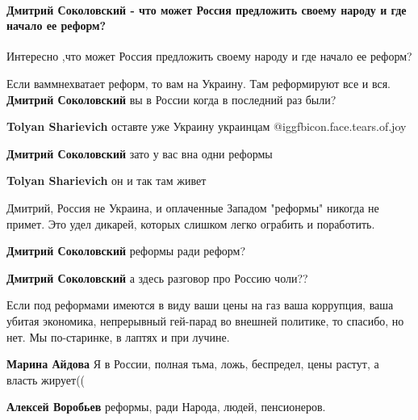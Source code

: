  
 
 
 
 
\paragraph{Дмитрий Соколовский - что может Россия предложить своему народу и где начало ее реформ?}

\begin{itemize} %
Интересно ,что может Россия предложить своему народу и где начало ее реформ?

\begin{itemize} %
Если ваммнехватает реформ, то вам на Украину. Там реформируют все и вся.
\textbf{Дмитрий Соколовский} вы в России когда в последний раз были?

\textbf{Tolyan Sharievich} оставте уже Украину украинцам @igg{fbicon.face.tears.of.joy} 

\textbf{Дмитрий Соколовский} зато у вас вна одни реформы

\textbf{Tolyan Sharievich} он и так там живет

Дмитрий, Россия не Украина, и оплаченные Западом "реформы" никогда не примет. Это удел дикарей, которых слишком легко ограбить и поработить.

\textbf{Дмитрий Соколовский} реформы ради реформ?

\textbf{Дмитрий Соколовский} а здесь разговор про Россию чоли??


Если под реформами имеются в виду ваши цены на газ ваша коррупция, ваша убитая
экономика, непрерывный гей-парад во внешней политике, то спасибо, но нет. Мы
по-старинке, в лаптях и при лучине.

\textbf{Марина Айдова} Я в России, полная тьма, ложь, беспредел, цены растут, а власть жирует((

\textbf{Алексей Воробьев} реформы, ради Народа, людей, пенсионеров.


\end{itemize}
\end{itemize}
